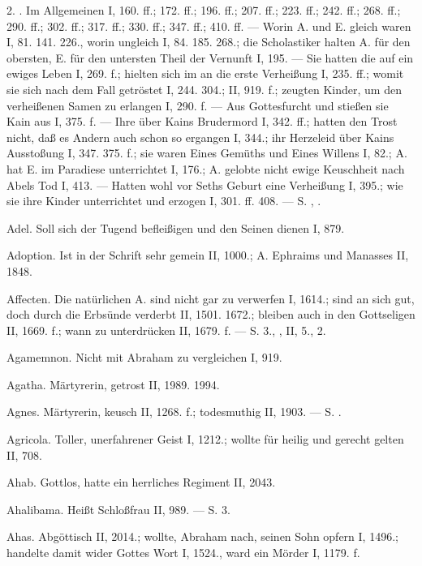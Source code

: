 2. . Im Allgemeinen I, 160. ff.; 172. ff.; 196. ff.; 207. ff.; 223. ff.; 242. ff.; 268. ff.;
290. ff.; 302. ff.; 317. ff.; 330. ff.; 347. ff.; 410. ff. — Worin A. und E. gleich waren I, 81. 141. 226., worin ungleich I, 84. 185. 268.; die Scholastiker halten A. für den obersten, E. für den untersten Theil der Vernunft I, 195. — Sie hatten die  auf ein ewiges Leben I, 269. f.; hielten sich im  an die erste Verheißung I, 235. ff.; womit sie sich nach dem Fall getröstet I, 244. 304.; II, 919. f.; zeugten Kinder, um den verheißenen Samen zu erlangen I, 290. f. — Aus Gottesfurcht und  stießen sie Kain aus I, 375. f. — Ihre  über Kains Brudermord I, 342. ff.; hatten den Trost nicht, daß es Andern auch schon so ergangen I, 344.; ihr Herzeleid über Kains Ausstoßung I, 347. 375. f.; sie waren Eines Gemüths und Eines Willens I, 82.; A. hat E. im Paradiese unterrichtet I, 176.; A. gelobte nicht ewige Keuschheit nach Abels Tod I, 413. — Hatten wohl vor Seths Geburt eine Verheißung I, 395.; wie sie ihre Kinder unterrichtet und erzogen I, 301. ff. 408. — S. , .

Adel. Soll sich der Tugend befleißigen und den Seinen dienen I, 879.

Adoption. Ist in der Schrift sehr gemein II, 1000.; A. Ephraims und Manasses II, 1848.

Affecten. Die natürlichen A. sind nicht gar zu verwerfen I, 1614.; sind an sich gut, doch durch die Erbsünde verderbt II, 1501. 1672.; bleiben auch in den Gottseligen II, 1669. f.; wann zu unterdrücken II, 1679. f. — S.  3., ,  II, 5.,  2.

Agamemnon. Nicht mit Abraham zu vergleichen I, 919.

Agatha. Märtyrerin, getrost II, 1989. 1994.

Agnes. Märtyrerin, keusch II, 1268. f.; todesmuthig II, 1903. — S. .

Agricola. Toller, unerfahrener Geist I, 1212.; wollte für heilig und gerecht gelten II, 708.

Ahab. Gottlos, hatte ein herrliches Regiment II, 2043.

Ahalibama. Heißt Schloßfrau II, 989. — S.  3.

Ahas. Abgöttisch II, 2014.; wollte, Abraham nach, seinen Sohn opfern I, 1496.; handelte damit wider Gottes Wort I, 1524., ward ein Mörder I, 1179. f.

